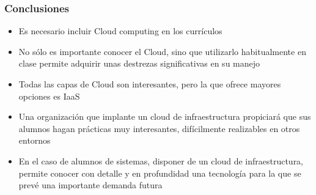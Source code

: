 \documentclass{beamer}
\begin{document}
\begin{frame}
  \frametitle{Conclusiones}
  \begin{itemize}
  \item Es necesario incluir Cloud computing en los currículos
  \item No sólo es importante conocer el Cloud, sino que utilizarlo
    habitualmente en clase permite adquirir unas destrezas significativas en su
    manejo
  \item Todas las capas de Cloud son interesantes, pero la que ofrece mayores
    opciones es IaaS
  \item Una organización que implante un cloud de infraestructura propiciará que
    sus alumnos hagan prácticas muy interesantes, difícilmente realizables en
    otros entornos
  \item En el caso de alumnos de sistemas, disponer de un cloud de
    infraestructura, permite conocer con detalle y en profundidad una tecnología
    para la que se prevé una importante demanda futura
  \end{itemize}
\end{frame}
\end{document}
